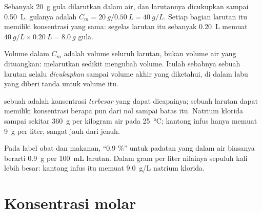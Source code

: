 \begin{example}\label{ex:g10:concentration-and-dilution:sugar}
Sebanyak \qty{20}{g} gula dilarutkan dalam air, dan larutannya
dicukupkan sampai \qty{0.50}{L}.  gulanya adalah
$C_m = \qty{20}{g} / \qty{0.50}{L} = \qty{40}{g/L}$. Setiap bagian
larutan itu memiliki konsentrasi yang sama: segelas larutan itu
sebanyak \qty{0.20}{L} memuat
$\qty{40}{g/L} \times \qty{0.20}{L} = \qty{8.0}{g}$ gula.
\end{example}


\begin{remark}\label{rem:g10:concentration-and-dilution:volume}
Volume dalam $C_m$ adalah volume seluruh larutan, bukan volume air yang
dituangkan: melarutkan  sedikit mengubah volume. Itulah
sebabnya sebuah larutan selalu \emph{dicukupkan} sampai volume akhir
yang diketahui, di dalam labu yang diberi tanda untuk volume itu.
\end{remark}

\begin{remark}\label{rem:g10:concentration-and-dilution:not-solubility}
 sebuah  adalah konsentrasi \emph{terbesar} yang
dapat dicapainya; sebuah larutan dapat memiliki konsentrasi berapa pun
dari nol sampai batas itu. Natrium klorida  sampai sekitar
\qty{360}{g} per kilogram air pada \qty{25}{\celsius}; kantong infus
hanya memuat \qty{9}{g} per liter, sangat jauh dari jenuh.
\end{remark}

\begin{remark}\label{rem:g10:concentration-and-dilution:percent}
Pada label obat dan makanan, ``0.9 \%'' untuk padatan yang  dalam
air biasanya berarti \qty{0.9}{g}  per \qty{100}{mL}
larutan. Dalam gram per liter nilainya sepuluh kali lebih besar: kantong
infus itu memuat \qty{9.0}{g/L} natrium klorida.
\end{remark}

\section{Konsentrasi molar}

